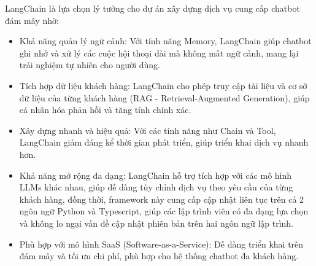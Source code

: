 \begin{enumerate}
	LangChain là lựa chọn lý tưởng cho dự án xây dựng dịch vụ cung cấp chatbot đám mây nhờ:
	\begin{itemize}
		\item Khả năng quản lý ngữ cảnh: Với tính năng Memory, LangChain giúp chatbot ghi nhớ và xử lý các cuộc hội thoại dài mà không mất ngữ cảnh, mang lại trải nghiệm tự nhiên cho người dùng.
		\item Tích hợp dữ liệu khách hàng: LangChain cho phép truy cập tài liệu và cơ sở dữ liệu của từng khách hàng (RAG - Retrieval-Augmented Generation), giúp cá nhân hóa phản hồi và tăng tính chính xác.
		\item Xây dựng nhanh và hiệu quả: Với các tính năng như Chain và Tool, LangChain giảm đáng kể thời gian phát triển, giúp triển khai dịch vụ nhanh hơn.
		\item Khả năng mở rộng đa dạng: LangChain hỗ trợ tích hợp với các mô hình LLMs khác nhau, giúp dễ dàng tùy chỉnh dịch vụ theo yêu cầu của từng khách hàng, đồng thời, framework này cung cấp cập nhật liên tục trên cả 2 ngôn ngữ Python và Typescript, giúp các lập trình viên có đa dạng lựa chọn và không lo ngại vấn đề cập nhật phiên bản trên hai ngôn ngữ lập trình.
		\item Phù hợp với mô hình SaaS (Software-as-a-Service): Dễ dàng triển khai trên đám mây và tối ưu chi phí, phù hợp cho hệ thống chatbot đa khách hàng.
	\end{itemize}
	
\end{enumerate}
\renewcommand{\labelenumi}{\arabic{enumi}.}

